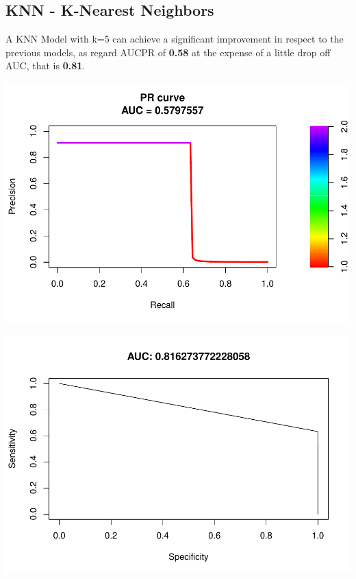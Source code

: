 \documentclass[]{article}
\begin{document}
\hypertarget{knn---k-nearest-neighbors}{%
\subsection{KNN - K-Nearest Neighbors}\label{knn---k-nearest-neighbors}}

A KNN Model with k=5 can achieve a significant improvement in respect to
the previous models, as regard AUCPR of \textbf{0.58} at the expense of
a little drop off AUC, that is \textbf{0.81}.

\begin{center}\includegraphics{Credit_Card_Fraud_Detection_Project_Report_files/figure-latex/unnamed-chunk-18-1} \end{center}

\begin{center}\includegraphics{Credit_Card_Fraud_Detection_Project_Report_files/figure-latex/unnamed-chunk-18-2} \end{center}
\end{document}
